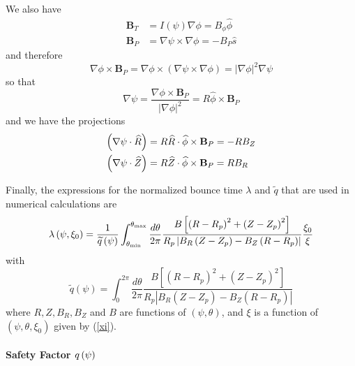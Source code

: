 We also have 
\begin{align}
\mathbf{B}_{T}& =I\left( \psi \right) \nabla \phi =B_{\phi }\widehat{\phi }
\label{Bt} \\
\mathbf{B}_{P}& =\nabla \psi \times \nabla \phi =-B_{P}\widehat{s}
\label{Bp}
\end{align}
and therefore 
\begin{equation}
\nabla \phi \times \mathbf{B}_{P}=\nabla \phi \times \left( \nabla \psi
\times \nabla \phi \right) =\left| \nabla \phi \right| ^{2}\nabla \psi
\end{equation}
so that 
\begin{equation}
\nabla \psi =\frac{\nabla \phi \times \mathbf{B}_{P}}{\left| \nabla \phi
\right| ^{2}}=R\widehat{\phi }\times \mathbf{B}_{P}
\end{equation}
and we have the projections 
\begin{align}
\left( \nabla \psi \cdot \widehat{R}\right) & =R\widehat{R}\cdot \widehat{
\phi }\times \mathbf{B}_{P}=-RB_{Z} \\
\left( \nabla \psi \cdot \widehat{Z}\right) & =R\widehat{Z}\cdot \widehat{%
\phi }\times \mathbf{B}_{P}=RB_{R}
\end{align}

Finally, the expressions for the normalized bounce time $\lambda $ and $%
\widetilde{q}$ that are used in numerical calculations are 
\begin{equation}
\lambda \left( \psi ,\xi _{0}\right) =\frac{1}{\widetilde{q}\left( \psi
\right) }\int_{\theta _{\min }}^{\theta _{\max }}\frac{d\theta }{2\pi }\frac{%
B\left[ \left( R-R_{p}\right) ^{2}+\left( Z-Z_{p}\right) ^{2}\right] }{%
R_{p}\left| B_{R}\left( Z-Z_{p}\right) -B_{Z}\left( R-R_{p}\right) \right| }%
\frac{\xi _{0}}{\xi }  \label{lambda1}
\end{equation}
with 
\begin{equation}
\widetilde{q}\left( \psi \right) =\int_{0}^{2\pi }\frac{d\theta }{2\pi }%
\frac{B\left[ \left( R-R_{p}\right) ^{2}+\left( Z-Z_{p}\right) ^{2}\right] }{
R_{p}\left| B_{R}\left( Z-Z_{p}\right) -B_{Z}\left( R-R_{p}\right) \right| }
\end{equation}
where $R,Z,B_{R},B_{Z}$ and $B$ are functions of $\left( \psi ,\theta
\right) $, and $\xi $ is a function of $\left( \psi ,\theta ,\xi _{0}\right) 
$ given by (\ref{xi}).

\paragraph{Safety Factor $q\left( \protect\psi\right) $}

